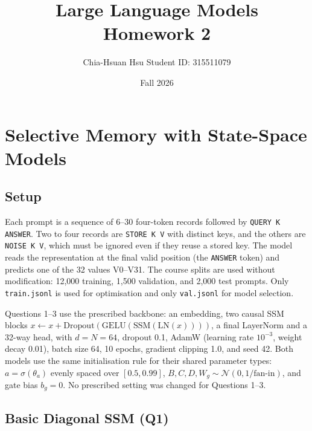 \documentclass[11pt,a4paper]{article}
\title{Large Language Models\\
Homework 2}
\author{Chia-Hsuan Hsu \quad Student ID: 315511079}
\date{Fall 2026}
\begin{document}
\maketitle


\section{Selective Memory with State-Space Models}

\subsection{Setup}

Each prompt is a sequence of 6--30 four-token records followed by
\texttt{QUERY K ANSWER}. Two to four records are \texttt{STORE K V}
with distinct keys, and the others are \texttt{NOISE K V}, which must be
ignored even if they reuse a stored key. The model reads the
representation at the final valid position (the \texttt{ANSWER} token)
and predicts one of the 32 values V0--V31. The course splits are used
without modification: 12,000 training, 1,500 validation, and 2,000 test
prompts. Only \texttt{train.jsonl} is used for optimisation and only
\texttt{val.jsonl} for model selection.

Questions 1--3 use the prescribed backbone: an embedding, two causal
SSM blocks $x \leftarrow x+\mathrm{Dropout}(\mathrm{GELU}(\mathrm{SSM}(\mathrm{LN}(x))))$,
a final LayerNorm and a 32-way head, with $d=N=64$, dropout 0.1, AdamW
(learning rate $10^{-3}$, weight decay 0.01), batch size 64, 10 epochs,
gradient clipping 1.0, and seed 42. Both models use the same
initialisation rule for their shared parameter types:
$a=\sigma(\theta_a)$ evenly spaced over $[0.5,0.99]$,
$B,C,D,W_g\sim\mathcal{N}(0,1/\text{fan-in})$, and gate bias $b_g=0$.
No prescribed setting was changed for Questions 1--3.


\subsection{Basic Diagonal SSM (Q1)}
\end{document}
